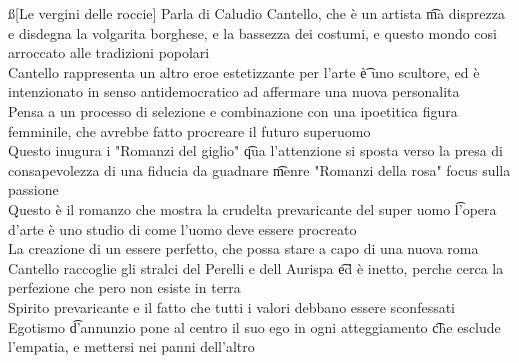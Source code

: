 \documentclass[12pt]{article}
\begin{document}
\ss[Le vergini delle roccie]
Parla di Caludio Cantello, che è un artista \t ma disprezza e disdegna la volgarita borghese, e la bassezza dei costumi, e questo mondo cosi arroccato alle tradizioni popolari \\
Cantello rappresenta un altro eroe estetizzante per l'arte \t è uno scultore, ed è intenzionato in senso antidemocratico ad affermare una nuova personalita \\
Pensa a un processo di selezione e combinazione con una ipoetitica figura femminile, che avrebbe fatto procreare il futuro superuomo \\
Questo inugura i "Romanzi del giglio" \t qua l'attenzione si sposta verso la presa di consapevolezza di una fiducia da guadnare \t menre "Romanzi della rosa" focus sulla passione \\
Questo è il romanzo che mostra la crudelta prevaricante del super uomo \t l'opera d'arte è uno studio di come l'uomo deve essere procreato \\
La creazione di un essere perfetto, che possa stare a capo di una nuova roma \\
Cantello raccoglie gli stralci del Perelli e dell Aurispa \t ed è inetto, perche cerca la perfezione che pero non esiste in terra \\
Spirito prevaricante e il fatto che tutti i valori debbano essere sconfessati \\
Egotismo \t d'annunzio pone al centro il suo ego in ogni atteggiamento \t che esclude l'empatia, e mettersi nei panni dell'altro
\end{document}
